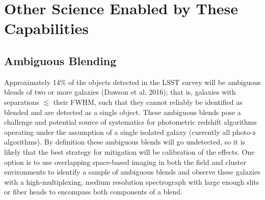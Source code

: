\section{Other Science Enabled by These Capabilities}


%
%


\subsection{Ambiguous Blending}
Approximately 14\% of the objects detected in the LSST survey will be ambiguous
blends of two or more galaxies (Dawson et al. 2016); that is, galaxies with
separations $\lesssim$ their FWHM, such that they cannot reliably be identified as blended and are detected as a single object. These ambiguous blends pose a challenge and
potential source of systematics for photometric redshift algorithms operating
under the assumption of a single isolated galaxy (currently all photo-z
algorithms). By definition these ambiguous blends will go undetected, so it is likely that the best strategy for mitigation will be calibration of the effects.  One option  is to use overlapping space-based imaging in both the field and cluster
environments to identify a sample of ambiguous blends and observe these galaxies
with a high-multiplexing, medium resolution spectrograph with large enough slits or fiber heads to encompass both components of a blend.
%
